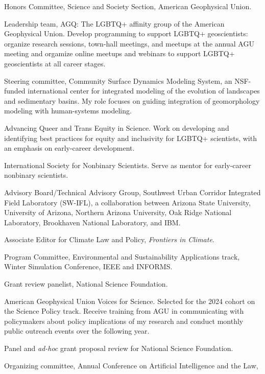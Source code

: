 \item[2025--present] Honors Committee, Science and Society Section,
  American Geophysical Union.
\item[2025--present] Leadership team, AGQ: The LGBTQ+ affinity group of the
  American Geophysical Union. Develop programming to support LGBTQ+
  geoscientists: organize research sessions, town-hall meetings, and meetups
  at the annual AGU meeting and orgamize online meetups and webinars to support
  LGBTQ+ geoscientists at all career stages.
\item[2024--present] Steering committee, Community Surface Dynamics Modeling
  System, an NSF-funded international center for integrated modeling of
  the evolution of landscapes and sedimentary basins. My role focuses on guiding
  integration of geomorphology modeling with human-systems modeling.
\item[2024--present] Advancing Queer and Trans Equity in Science.
  Work on developing and identifying best practices for equity and
  inclusivity for LGBTQ+ scientists, with an emphasis on early-career development.
\item[2023--present] International Society for Nonbinary Scientists.
Serve as mentor for early-career nonbinary scientists.
\item[2023--2026] Advisory Board/Technical Advisory Group,
Southwest Urban Corridor Integrated Field Laboratory (SW-IFL),
a collaboration between Arizona State University, University of Arizona,
Northern Arizona University, Oak Ridge National Laboratory,
Brookhaven National Laboratory, and IBM.
\item[2021--present] Associate Editor for Climate Law and Policy,
   \emph{Frontiers in Climate}.
\item[2016--2025] Program Committee,
  Environmental and Sustainability Applications track,
  Winter Simulation Conference, IEEE and INFORMS.
\item[2025] Grant review panelist, National Science Foundation.
\item[2024--2025] American Geophysical Union Voices for Science. Selected for
the 2024 cohort on the Science Policy track. Receive training from AGU in
communicating with policymakers about policy implications of my research and
conduct monthly public outreach events over the following year.
\item[2023] Panel and \emph{ad-hoc\/} grant proposal review for National Science Foundation.
\item[2016--2022] Organizing committee,
  Annual Conference on Artificial Intelligence and the Law,
